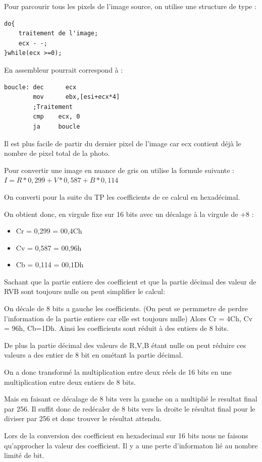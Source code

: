 \documentclass[11pt]{report}
\begin{document}
Pour parcourir tous les pixels de l'image source, on utilise une structure de type :
\begin{lstlisting}
do{
	traitement de l'image;
	ecx - -;
}while(ecx >=0);
\end{lstlisting}
\medskip

En assembleur pourrait correspond à :

\begin{lstlisting}
boucle: dec      ecx
        mov		 ebx,[esi+ecx*4]
        ;Traitement
        cmp    ecx, 0
        ja     boucle
\end{lstlisting}

Il est plus facile de partir du dernier pixel de l'image car ecx contient déjà le nombre de pixel total de la photo.

Pour convertir une image en nuance de gris on utilise la formule suivante :
$I=R*0,299+V*0,587+B*0,114$

On converti pour la suite du TP les coefficients de ce calcul en hexadécimal.

On obtient donc, en virgule fixe sur 16 bits avec un décalage à la virgule de +8 :
\begin{itemize}
\item  Cr = 0,299 =  00,4Ch
\item  Cv = 0,587 = 00,96h
\item  Cb = 0,114 = 00,1Dh
\end{itemize}

Sachant que la partie entiere des coefficient et que la partie décimal des valeur de RVB sont toujours nulle on peut simplifier le calcul:

On décale de 8 bits a gauche les coefficients. (On peut se permmetre de perdre l'information de la partie entiere car elle est toujours nulle)
Alors Cr = 4Ch, Cv = 96h, Cb=1Dh.
Ainsi les coefficients sont réduit à des entiers de 8 bits.

De plus la partie décimal des valeurs de R,V,B étant nulle on peut réduire ces valeurs a des entier de 8 bit en ométant la partie décimal.

On a donc transformé la multiplication entre deux réels de 16 bits en une multiplication entre deux entiers de 8 bits.

Mais en faisant ce décalage de 8 bits vers la gauche on a multiplié le resultat final par 256.
Il suffit donc de redécaler de 8 bits vers la droite le résultat final pour le diviser par 256 et donc trouver le résultat attendu.


Lors de la conversion des coefficient en hexadecimal sur 16 bits nous ne faisons qu'approcher la valeur des coefficient. Il y a une perte d'informaton lié au nombre limité de bit.
\end{document}
